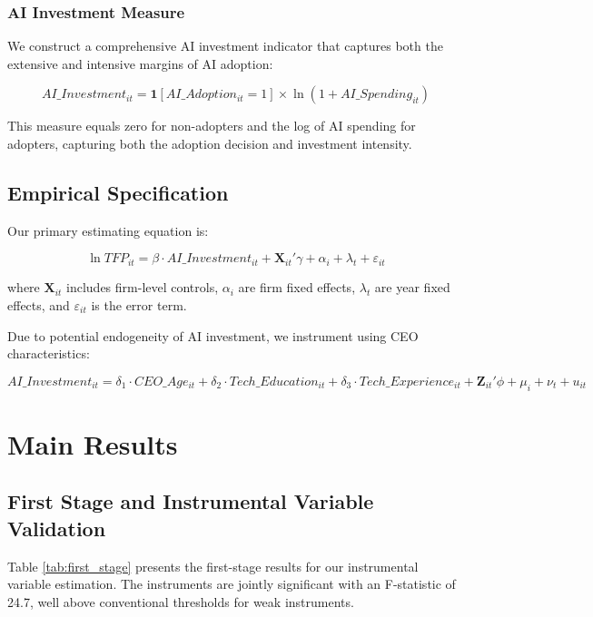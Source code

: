 \documentclass[12pt]{article}
\begin{document}
\subsubsection{AI Investment Measure}

We construct a comprehensive AI investment indicator that captures both the extensive and intensive margins of AI adoption:

\begin{equation}
AI\_Investment_{it} = \mathbf{1}[AI\_Adoption_{it} = 1] \times \ln(1 + AI\_Spending_{it})
\end{equation}

This measure equals zero for non-adopters and the log of AI spending for adopters, capturing both the adoption decision and investment intensity.

\subsection{Empirical Specification}

Our primary estimating equation is:

\begin{equation}
\ln TFP_{it} = \beta \cdot AI\_Investment_{it} + \mathbf{X}_{it}'\gamma + \alpha_i + \lambda_t + \varepsilon_{it}
\end{equation}

where $\mathbf{X}_{it}$ includes firm-level controls, $\alpha_i$ are firm fixed effects, $\lambda_t$ are year fixed effects, and $\varepsilon_{it}$ is the error term.

Due to potential endogeneity of AI investment, we instrument using CEO characteristics:

\begin{equation}
AI\_Investment_{it} = \delta_1 \cdot CEO\_Age_{it} + \delta_2 \cdot Tech\_Education_{it} + \delta_3 \cdot Tech\_Experience_{it} + \mathbf{Z}_{it}'\phi + \mu_i + \nu_t + u_{it}
\end{equation}

\section{Main Results}

\subsection{First Stage and Instrumental Variable Validation}

Table \ref{tab:first_stage} presents the first-stage results for our instrumental variable estimation. The instruments are jointly significant with an F-statistic of 24.7, well above conventional thresholds for weak instruments.
\end{document}
